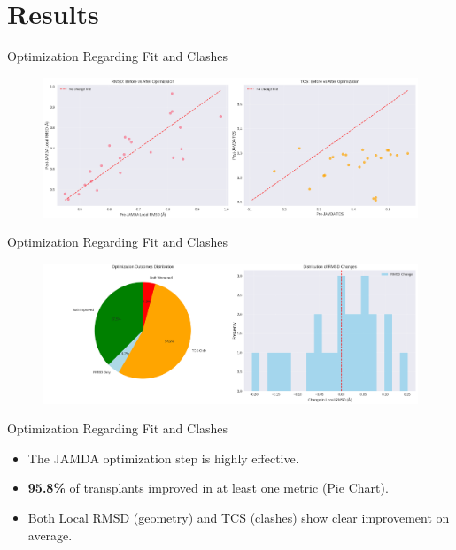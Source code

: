\documentclass[aspectratio=169]{beamer}
\begin{document}
\section{Results}

\begin{frame}{Optimization Regarding Fit and Clashes}
    \begin{figure}
        \includegraphics[width=\textwidth, keepaspectratio]{images/optimization_effectiveness_1.png}
    \end{figure}
\end{frame}
\begin{frame}{Optimization Regarding Fit and Clashes}
	\begin{figure}
		\includegraphics[width=\textwidth, keepaspectratio]{images/optimization_effectiveness_2.png}
	\end{figure}
\end{frame}
\begin{frame}{Optimization Regarding Fit and Clashes}
    \begin{itemize}
        \item The JAMDA optimization step is highly effective.
        \item \textbf{95.8\%} of transplants improved in at least one metric (Pie Chart).
        \item Both Local RMSD (geometry) and TCS (clashes) show clear improvement on average.
    \end{itemize}
\end{frame}
\end{document}
